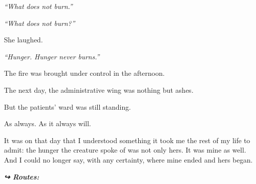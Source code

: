 \noindent \textit{\textquotedblleft{}What does not burn.\textquotedblright{}}

\noindent \textit{\textquotedblleft{}What does not burn?\textquotedblright{}}

\noindent She laughed.

\noindent \textit{\textquotedblleft{}Hunger. Hunger never burns.\textquotedblright{}}

\noindent The fire was brought under control in the afternoon.

\noindent The next day, the administrative wing was nothing but ashes.

\noindent But the patients' ward was still standing.

\noindent As always.
As it always will.

\noindent It was on that day that I understood something it took me the rest of my life to admit: the hunger the creature spoke of was not only hers. It was mine as well. And I could no longer say, with any certainty, where mine ended and hers began.

\vspace{0.5em}
\noindent\textit{\textbf{↪ Routes:}  \rotasep {}}
